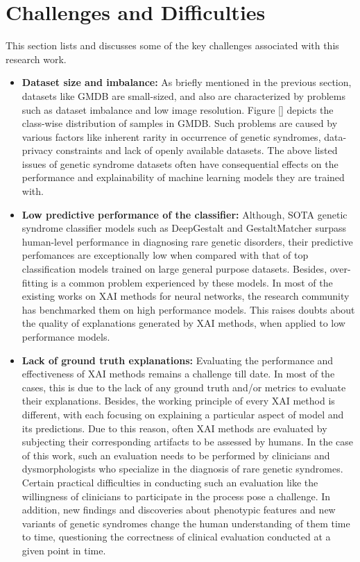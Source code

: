 \documentclass[../report.tex]{subfiles}
\begin{document}
    \section{Challenges and Difficulties} \label{sec_challenges}
    This section lists and discusses some of the key challenges associated with this research work.
	\begin{itemize}
		\item \textbf{Dataset size and imbalance: }As briefly mentioned in the previous section, datasets like GMDB \cite{hsieh2022gestaltmatcher} are small-sized, and also are characterized by problems such as dataset imbalance and low image resolution. Figure \ref{} depicts the class-wise distribution of samples in GMDB. Such problems are caused by various factors like inherent rarity in occurrence of genetic syndromes, data-privacy constraints and lack of openly available datasets. The above listed issues of genetic syndrome datasets often have consequential effects on the performance and explainability of machine learning models they are trained with. 

		\item \textbf{Low predictive performance of the classifier: }Although, SOTA genetic syndrome classifier models such as DeepGestalt \cite{Gurovich2019} and GestaltMatcher \cite{hsieh2022gestaltmatcher} surpass human-level performance in diagnosing rare genetic disorders, their predictive perfomances are exceptionally low when compared with that of top classification models trained on large general purpose datasets. Besides, over-fitting is a common problem experienced by these models. In most of the existing works on XAI methods for neural networks, the research community has benchmarked them on high performance models. This raises doubts about the quality of explanations generated by XAI methods, when applied to low performance models.
	
		\item \textbf{Lack of ground truth explanations: }Evaluating the performance and effectiveness of XAI methods remains a challenge till date. In most of the cases, this is due to the lack of any ground truth and/or metrics to evaluate their explanations. Besides, the working principle of every XAI method is different, with each focusing on explaining a particular aspect of model and its predictions. Due to this reason, often XAI methods are evaluated by subjecting their corresponding artifacts to be assessed by humans. In the case of this work, such an evaluation needs to be performed by clinicians and dysmorphologists who specialize in the diagnosis of rare genetic syndromes. Certain practical difficulties in conducting such an evaluation like the willingness of clinicians to participate in the process pose a challenge. In addition, new findings and discoveries about phenotypic features and new variants of genetic syndromes change the human understanding of them time to time, questioning the correctness of clinical evaluation conducted at a given point in time.
\end{itemize}
   
\end{document}
